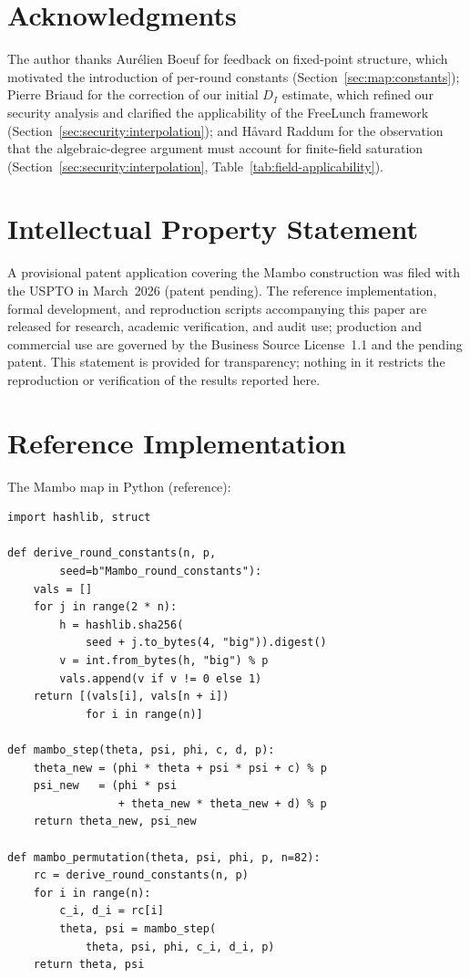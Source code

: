 \documentclass[11pt,a4paper]{article}
\theoremstyle{definition}
\begin{document}
\section*{Acknowledgments}

The author thanks Aur\'{e}lien Boeuf for feedback on fixed-point
structure, which motivated the introduction of per-round constants
(Section~\ref{sec:map:constants}); Pierre Briaud for the
correction of our initial $D_I$ estimate, which refined our security
analysis and clarified the applicability of the FreeLunch framework
(Section~\ref{sec:security:interpolation}); and H{\aa}vard Raddum for
the observation that the algebraic-degree argument must account for
finite-field saturation
(Section~\ref{sec:security:interpolation},
Table~\ref{tab:field-applicability}).

\section*{Intellectual Property Statement}

A provisional patent application covering the Mambo construction was
filed with the USPTO in March~2026 (patent pending). The reference
implementation, formal development, and reproduction scripts
accompanying this paper are released for research, academic
verification, and audit use; production and commercial use are
governed by the Business Source License~1.1 and the pending patent.
This statement is provided for transparency; nothing in it restricts the
reproduction or verification of the results reported here.


\appendix

\section{Reference Implementation}\label{app:reference}

The Mambo map in Python (reference):
\begin{verbatim}
import hashlib, struct

def derive_round_constants(n, p,
        seed=b"Mambo_round_constants"):
    vals = []
    for j in range(2 * n):
        h = hashlib.sha256(
            seed + j.to_bytes(4, "big")).digest()
        v = int.from_bytes(h, "big") % p
        vals.append(v if v != 0 else 1)
    return [(vals[i], vals[n + i])
            for i in range(n)]

def mambo_step(theta, psi, phi, c, d, p):
    theta_new = (phi * theta + psi * psi + c) % p
    psi_new   = (phi * psi
                 + theta_new * theta_new + d) % p
    return theta_new, psi_new

def mambo_permutation(theta, psi, phi, p, n=82):
    rc = derive_round_constants(n, p)
    for i in range(n):
        c_i, d_i = rc[i]
        theta, psi = mambo_step(
            theta, psi, phi, c_i, d_i, p)
    return theta, psi
\end{verbatim}
\end{document}
